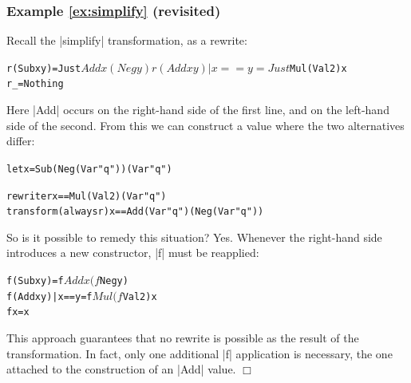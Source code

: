 \documentclass[preprint]{sigplanconf}
\newcommand{\noexample}{\hfill$\Box$}
\newenvironment{code}{\begin{alltt}\small}{\end{alltt}}
\newenvironment{revisit}[1]{\subsubsection*{Example #1 (revisited)}}{\noexample}
\newcommand{\ignore}{}
\begin{document}
\begin{revisit}{\ref{ex:simplify}}

Recall the |simplify| transformation, as a rewrite:

\begin{code}
r (Sub x y)           = Just $ Add x (Neg y)
r (Add x y) | x == y  = Just $ Mul (Val 2) x
r _                   = Nothing
\end{code}

Here |Add| occurs on the right-hand side of the first line, and on the left-hand side of the second. From this we can construct a value where the two alternatives differ:

\ignore\begin{code}
let x = Sub (Neg (Var "q")) (Var "q")

rewrite    r           x == Mul (Val 2) (Var "q")
transform  (always r)  x == Add (Var "q") (Neg (Var "q"))
\end{code}

So is it possible to remedy this situation? Yes. Whenever the right-hand side introduces a new constructor, |f| must be reapplied:

\begin{code}
f (Sub x y)           = f $ Add x (f $ Neg y)
f (Add x y) | x == y  = f $ Mul (f $ Val 2) x
f x                   = x
\end{code}

This approach guarantees that no rewrite is possible as the result of the transformation. In fact, only one additional |f| application is necessary, the one attached to the construction of an |Add| value.
\end{revisit}
\end{document}
